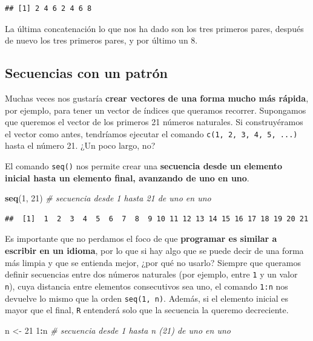 \documentclass[11pt,]{book}
\newenvironment{Shaded}{\begin{snugshade}}{\end{snugshade}}
\newcommand{\CommentTok}[1]{\textcolor[rgb]{0.37,0.37,0.37}{\textit{#1}}}
\newcommand{\DecValTok}[1]{\textcolor[rgb]{0.06,0.06,0.06}{#1}}
\newcommand{\KeywordTok}[1]{\textcolor[rgb]{0.27,0.27,0.27}{\textbf{#1}}}
\newcommand{\NormalTok}[1]{#1}
\newcommand{\OperatorTok}[1]{\textcolor[rgb]{0.43,0.43,0.43}{\textbf{#1}}}
\newcommand{\StringTok}[1]{\textcolor[rgb]{0.5,0.5,0.5}{#1}}
\begin{document}
\begin{verbatim}
## [1] 2 4 6 2 4 6 8
\end{verbatim}

La última concatenación lo que nos ha dado son los tres primeros pares, después de nuevo los tres primeros pares, y por último un 8.

\hypertarget{secuencias-con-un-patruxf3n}{%
\subsection{Secuencias con un patrón}\label{secuencias-con-un-patruxf3n}}

Muchas veces nos gustaría \textbf{crear vectores de una forma mucho más rápida}, por ejemplo, para tener un vector de índices que queramos recorrer. Supongamos que queremos el vector de los primeros 21 números naturales. Si construyéramos el vector como antes, tendríamos ejecutar el comando \texttt{c(1,\ 2,\ 3,\ 4,\ 5,\ ...)} hasta el número 21. ¿Un poco largo, no?

El comando \texttt{seq()} nos permite crear una \textbf{secuencia desde un elemento inicial hasta un elemento final, avanzando de uno en uno}.

\begin{Shaded}
\begin{Highlighting}[]
\KeywordTok{seq}\NormalTok{(}\DecValTok{1}\NormalTok{, }\DecValTok{21}\NormalTok{) }\CommentTok{# secuencia desde 1 hasta 21 de uno en uno}
\end{Highlighting}
\end{Shaded}

\begin{verbatim}
##  [1]  1  2  3  4  5  6  7  8  9 10 11 12 13 14 15 16 17 18 19 20 21
\end{verbatim}

Es importante que no perdamos el foco de que \textbf{programar es similar a escribir en un idioma}, por lo que si hay algo que se puede decir de una forma más limpia y que se entienda mejor, ¿por qué no usarlo? Siempre que queramos definir secuencias entre dos números naturales (por ejemplo, entre \texttt{1} y un valor \texttt{n}), cuya distancia entre elementos consecutivos sea uno, el comando \texttt{1:n} nos devuelve lo mismo que la orden \texttt{seq(1,\ n)}. Además, si el elemento inicial es mayor que el final, \texttt{R} entenderá solo que la secuencia la queremo decreciente.

\begin{Shaded}
\begin{Highlighting}[]
\NormalTok{n <-}\StringTok{ }\DecValTok{21}
\DecValTok{1}\OperatorTok{:}\NormalTok{n }\CommentTok{# secuencia desde 1 hasta n (21) de uno en uno}
\end{Highlighting}
\end{Shaded}
\end{document}
